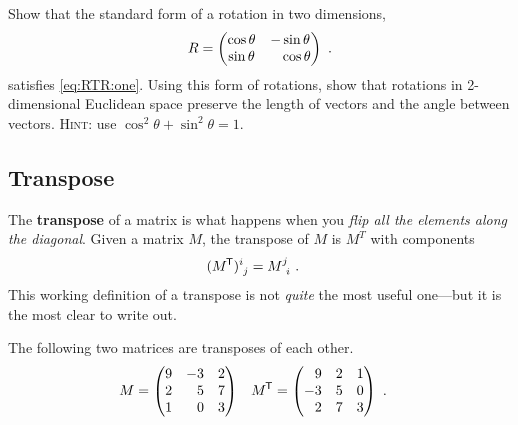 \documentclass[12pt, oneside]{report}    %
\let\oldsection\section
\def\section{%
  \setcounter{sidenote}{1}%
  \oldsection
}
\begin{document}
\begin{exercise}
Show that the standard form of a rotation in two dimensions,
\begin{align}
R=
    \begin{pmatrix}
    \cos \theta & -\sin\theta \\
    \sin \theta & \pp\cos\theta      
    \end{pmatrix} \ .
    \label{eq:2D:rotation:standard}
\end{align}
satisfies \eqref{eq:RTR:one}. Using this form of rotations, show that rotations in 2-dimensional Euclidean space preserve the length of vectors and the angle between vectors. \textsc{Hint}: use $\cos^2\theta + \sin^2\theta = 1$.
\end{exercise}

\begin{subappendices}
\section{Transpose}\label{sec:transpose}
The \textbf{transpose} of a matrix is what happens when you \emph{flip all the elements along the diagonal}. Given a matrix $M$, the transpose of $M$ is $M^T$ with components
\begin{align}
    (M^\trans)\aij{i}{j} &= M\aij{j}{i} \ .
    \label{eq:transpose:components}
\end{align}
This working definition of a transpose is not \emph{quite} the most useful one---but it is the most clear to write out.

\begin{example}
The following two matrices are transposes of each other.
\begin{align}
    M &= 
    \begin{pmatrix}
        9 & -3 & 2 \\
        2 & \pp 5 & 7 \\
        1 & \pp 0 & 3
    \end{pmatrix}
    &
    M^\trans &= 
    \begin{pmatrix}
        \pp 9 & 2 & 1 \\
        -3 & 5 & 0 \\
        \pp 2 & 7 & 3
    \end{pmatrix}
    \ .
\end{align}
\end{example}


\end{subappendices}
\end{document}
